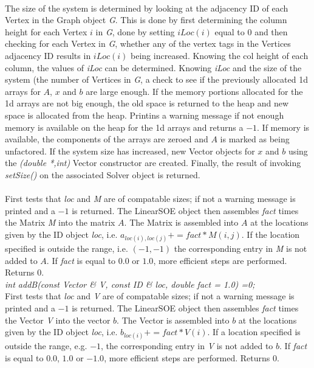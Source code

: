  \\ 
The size of the system is determined by looking at the adjacency ID of
each Vertex in the Graph object {\em G}. This is done by first
determining the column height for each Vertex $i$ in {\em G}, done by
setting $iLoc(i)$ equal to $0$ and then checking for each Vertex
in {\em G}, whether any of the vertex tags in the Vertices adjacency
ID results in $iLoc(i)$ being increased. Knowing the col height of
each column, the values of {\em iLoc} can be determined. Knowing {\em
iLoc} and the size of the system (the number of Vertices in {\em G}, 
a check to see if the previously allocated 1d arrays for $A$, $x$ and
$b$ are large enough. If the memory portions allocated for the 1d
arrays are not big enough, the old space is returned to the heap and
new space is allocated from the heap. Printins a warning message if
not enough memory is available on the heap for the 1d arrays and
returns a $-1$. If memory is available, the components of the arrays
are zeroed and $A$ is marked as being unfactored. If the system size
has increased, new Vector objects for $x$ and $b$ using the {\em
(double *,int)} Vector constructor are created. Finally, the result of 
invoking {\em setSize()} on the associated Solver object is
returned. \\ 


 \\
First tests that {\em loc} and {\em M} are of compatable sizes; if not
a warning message is printed and a $-1$ is returned. The LinearSOE
object then assembles {\em fact} times the Matrix {\em 
M} into the matrix $A$. The Matrix is assembled into $A$ at the
locations given by the ID object {\em loc}, i.e. $a_{loc(i),loc(j)} +=
fact * M(i,j)$. If the location specified is outside the range,
i.e. $(-1,-1)$ the corresponding entry in {\em M} is not added to
$A$. If {\em fact} is equal to $0.0$ or $1.0$, more efficient steps
are performed. Returns $0$.  \\


{\em int addB(const Vector \& V, const ID \& loc,
double fact = 1.0) =0;} \\
First tests that {\em loc} and {\em V} are of compatable sizes; if not
a warning message is printed and a $-1$ is returned. The LinearSOE
object then assembles {\em fact} times the Vector {\em V} into
the vector $b$. The Vector is assembled into $b$ at the locations
given by the ID object {\em loc}, i.e. $b_{loc(i)} += fact * V(i)$. If a
location specified is outside the range, e.g. $-1$, the corresponding
entry in {\em V} is not added to $b$. If {\em fact} is equal to $0.0$,
$1.0$ or $-1.0$, more efficient steps are performed. Returns $0$. \\


